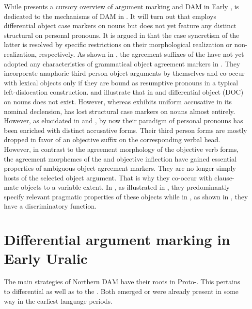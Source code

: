 \documentclass[output=paper]{LSP/langsci}
\begin{document}
While  presents a cursory overview of argument marking and DAM in Early ,  is dedicated to the mechanisms of DAM in . It will turn out that  employs differential object case markers on nouns but does not yet feature any distinct structural  on personal pronouns. It is argued in  that the case syncretism of the latter is resolved by specific restrictions on their morphological realization or non-realization, respectively. As shown in , the agreement suffixes of the  have not yet adopted any characteristics of grammatical object agreement markers in . They incorporate anaphoric third person object arguments by themselves and co-occur with lexical objects only if they are bound as resumptive pronouns in a typical left-dislocation construction.  and  illustrate that in  and  differential object  (DOC) on nouns does not exist. However, whereas  exhibits uniform accusative  in its nominal declension,  has lost structural case markers on nouns almost entirely. However, as elucidated in  and , by now their paradigm of personal pronouns has been enriched with distinct accusative forms. Their third person forms are mostly dropped in favor of an objective suffix on the corresponding verbal head. However, in contrast to the agreement morphology of the  objective verb forms, the agreement morphemes of the  and  objective inflection have gained essential properties of ambiguous object agreement markers. They are no longer simply hosts of the selected object argument. That is why they co-occur with clause-mate objects to a variable extent. In , as illustrated in , they predominantly specify relevant pragmatic properties of these objects while in , as shown in , they have a discriminatory function. 


\section{Differential argument marking in Early Uralic}\label{12-wr-sec:2}

The main strategies of Northern  DAM have their roots in Proto-. This pertains to differential  as well as to the . Both emerged or were already present in some way in the earliest  language periods. 
\end{document}
